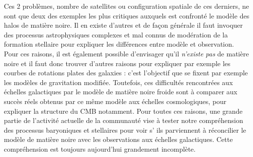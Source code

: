 Ces 2 problèmes, nombre de satellites ou configuration spatiale de ces derniers, ne sont que deux des exemples les plus critiques auxquels est confronté le modèle des halos de matière noire. Il en existe d'autres et de façon générale il faut invoquer des processus astrophysiques complexes et mal connus de modération de la formation stellaire pour expliquer les différences entre modèle et observation. Pour ces raisons, il est également possible d'envisager qu'il \textit{n'existe pas} de matière noire et il faut donc trouver d'autres raisons pour expliquer par exemple les courbes de rotations plates des galaxies : c'est l'objectif que se fixent par exemple les modèles de gravitation modifiée. Toutefois, ces difficultés rencontrées aux échelles galactiques par le modèle de matière noire froide sont à comparer aux succès réels obtenus par ce même modèle aux échelles cosmologiques, pour expliquer la structure du CMB notamment. Pour toutes ces raisons, une grande partie de l'activité actuelle de la communauté vise à tester notre compréhension des processus baryoniques et stellaires pour voir s’ ils parviennent à réconcilier le modèle de matière noire avec les observations aux échelles galactiques. Cette compréhension est toujours aujourd'hui grandement incomplète.
